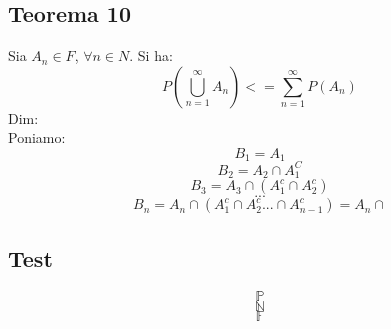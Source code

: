 \subsection{Teorema 10}
Sia $A_n \in F$, $\forall n \in N$. Si ha:
$$  P(\bigcup_{n=1}^{\infty} A_n) <= \sum_{n=1}^{\infty} P(A_n) $$
Dim:\\
Poniamo:
$$ B_1 = A_1 $$
$$ B_2 = A_2 \cap A_1^C $$
$$ B_3 = A_3 \cap (A_1^c \cap A_2^c) $$
$$ ... $$
$$ B_n = A_n \cap (A_1^c \cap A_2^c ... \cap A_{n-1}^c) = A_n \cap $$

\subsection{Test}
$$ \mathbb{P} $$
$$ \mathbb{N} $$
$$ \mathbb{F} $$







